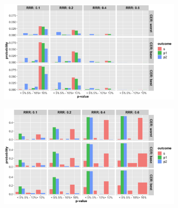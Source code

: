 \documentclass[]{article}
\begin{document}
\begin{figure}
\centering
  \caption{Probability that the p-value (from Fisher’s exact test) at termination of the trial is below 5\%, between 5\%
  and 10\% and greater than 10\% for cases where trial was (a) stopped for futility; (b) stopped for superiority. The
  rows represent the three control even rate scenarios and the three columns present the three relative risk reduction
  scenarios. Note: the denominator in each figure is the number of simulations (not the number of trials stopped for
  futility (a) or superiority (b), and thus, the proportions do not add up to 100\% within one figure. Further, (a) and
  (b) do not include simulations where the trial went to the max. allowed sample size. The bars should be interpreted
  with respect to the relative proportion that fit in each category.}
  \begin{subfigure}{0.8\textwidth}
    \centering
    \caption{}
    \includegraphics{../p1_plots/batch_size_nb_1000/pvalue_fut_p1.png}
  \end{subfigure}
  \bigbreak
  \begin{subfigure}{0.8\textwidth}
    \centering
    \caption{}
    \includegraphics{../p1_plots/batch_size_nb_1000/pvalue_sup_p1.png}
  \end{subfigure}
\end{figure}
\end{document}

